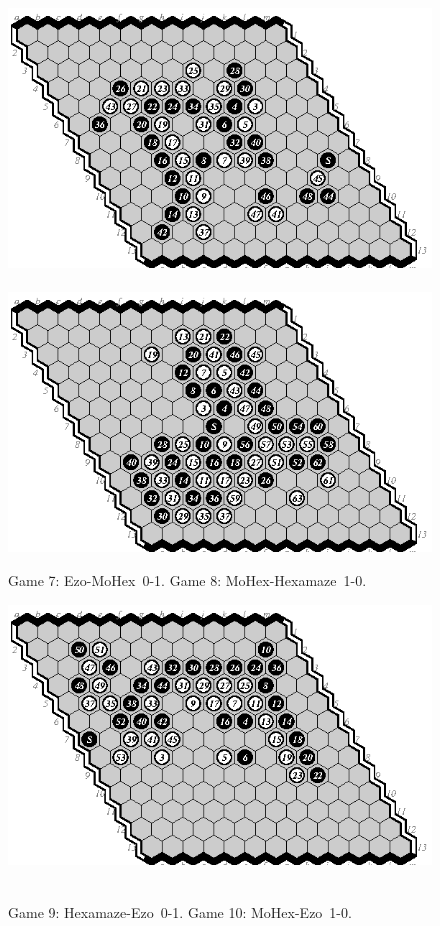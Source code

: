 \documentclass{icga}
\def\Eo{\mbox{\sc Ezo}}
\def\Hz{\mbox{\sc Hexamaze}}
\def\Mx{\mbox{\sc MoHex}}
\begin{document}
\begin{figure}[hbp]
\includegraphics[scale=1.2]{games/pix/13-07-em-0-1.eps}\hspace*{-1cm}\
\includegraphics[scale=1.2]{games/pix/13-08-mh-1-0.eps}
\caption{Game 7: \Eo-\Mx\ 0-1. Game 8: \Mx-\Hz\ 1-0.}
\end{figure}

\begin{figure}[hbp]
\includegraphics[scale=1.2]{games/pix/13-09-he-0-1.eps}\hspace*{-1cm}\
\caption{Game 9: \Hz-\Eo\ 0-1. Game 10: \Mx-\Eo\ 1-0.}
\end{figure}
\end{document}
